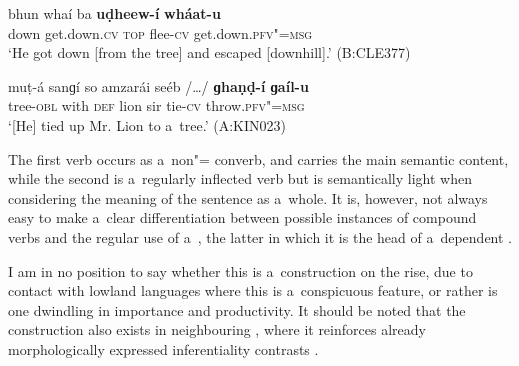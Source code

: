 \begin{exe}
\ex
\label{ex:8-26}
\gll bhun whaí ba \textbf{uḍheew-í} \textbf{wháat-u} \\
down get.down.\textsc{cv} \textsc{top} flee-\textsc{cv} get.down.\textsc{pfv"=msg} \\
\glt `He got down [from the tree] and escaped [downhill].' (B:CLE377)
\end{exe}
\begin{exe}
\ex
\label{ex:8-27}
\gll muṭ-á sanɡí so amzarái seéb /{\ldots}/ \textbf{ɡhaṇḍ-í} \textbf{ɡaíl-u} \\
tree-\textsc{obl} with \textsc{def} lion sir {} tie-\textsc{cv} throw.\textsc{pfv"=msg} \\
\glt `[He] tied up Mr. Lion to a~tree.' (A:KIN023)
\end{exe}

The first verb occurs as a~non"= converb, and carries the main semantic content, while the second is a~regularly inflected  verb but is semantically light when considering the meaning of the sentence as a~whole. It is, however, not always easy to make a~clear differentiation between possible instances of compound verbs and the regular use of a~, the latter in which it is the head of a~dependent . 



I am in no position to say whether this is a~construction on the rise, due to contact with lowland languages where this is a~conspicuous feature, or rather is one dwindling in importance and productivity. It should be noted that the construction also exists in neighbouring \iliKalasha, where it reinforces already morphologically expressed inferentiality contrasts \citep[1--4]{bashir1993}.